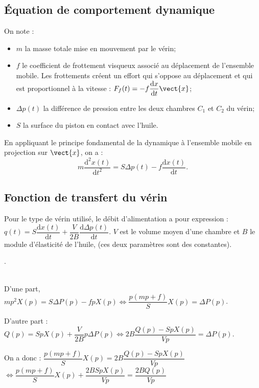 \begin{multicols}{2}
\subsection*{Équation de comportement dynamique}
\ifprof
\else
On note : 
\begin{itemize}
\item $m$ la masse totale mise en mouvement par le vérin;
\item $f$ le coefficient de frottement visqueux associé au déplacement de l'ensemble mobile. Les frottements créent un effort qui s'oppose au déplacement et qui est proportionnel à la vitesse : $F_f(t)=-f\dfrac{\text{d} x}{\text{d} t} \vect{x}$;
\item $\Delta p(t)$ la différence de pression entre les deux chambres $C_1$ et $C_2$ du vérin;
\item $S$ la surface du piston en contact avec l'huile.
\end{itemize}
En appliquant le principe fondamental de la dynamique à l'ensemble mobile en projection sur $\vect{x}$, on a : 
$$m\dfrac{\text{d}^2 x(t) }{\text{d}t^2}=S\Delta p(t)-f\dfrac{\text{d} x(t) }{\text{d}t}.$$
\fi


\subsection*{Fonction de transfert du vérin}
\ifprof
\else
Pour le type de vérin utilisé, le débit d'alimentation a pour expression : $q(t)=S\dfrac{\text{d}x(t)}{\text{d} t}+\dfrac{V}{2B}\dfrac{\text{d}\Delta p(t)}{\text{d}t}$. $V$ est le volume moyen d'une chambre et $B$ le module d'élasticité de l'huile, (ces deux paramètres sont des constantes).
\fi

.
\ifprof \begin{corrige} ~\\
D'une part, $mp^2X(p)=S\Delta P(p)-fpX(p) \Leftrightarrow \dfrac{p\left(mp+f\right)}{S}X(p)=\Delta P(p) $.

D'autre part :
$Q(p)=SpX(p)+\dfrac{V}{2B}p\Delta P(p) \Leftrightarrow 2B\dfrac{Q(p)-SpX(p)}{Vp}=\Delta P(p) $.

On a donc : 
$\dfrac{p\left(mp+f\right)}{S}X(p) =
2B\dfrac{Q(p)-SpX(p)}{Vp}$
$\Longleftrightarrow
\dfrac{p\left(mp+f\right)}{S}X(p) +\dfrac{2BSpX(p)}{Vp}=
\dfrac{2BQ(p)}{Vp}$


\end{corrige}
\end{multicols}
